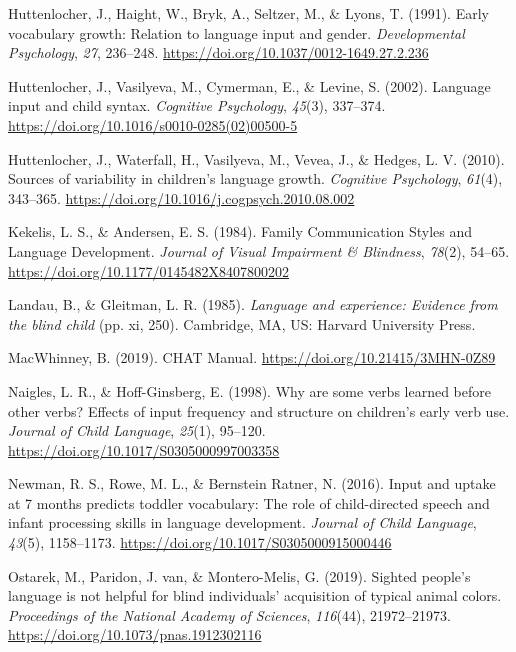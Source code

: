\documentclass[
  man]{apa6}
\newlength{\cslhangindent}
\newlength{\cslentryspacingunit} %
\newenvironment{CSLReferences}[2] %
 {%
  \setlength{\parindent}{0pt}
  \ifodd #1
  \let\oldpar\par
  \def\par{\hangindent=\cslhangindent\oldpar}
  \fi
  \setlength{\parskip}{#2\cslentryspacingunit}
 }%
 {}
\begin{document}
\begin{CSLReferences}{1}{0}
\leavevmode{}%
Huttenlocher, J., Haight, W., Bryk, A., Seltzer, M., \& Lyons, T. (1991). Early vocabulary growth: {Relation} to language input and gender. \emph{Developmental Psychology}, \emph{27}, 236--248. \url{https://doi.org/10.1037/0012-1649.27.2.236}

\leavevmode{}%
Huttenlocher, J., Vasilyeva, M., Cymerman, E., \& Levine, S. (2002). Language input and child syntax. \emph{Cognitive Psychology}, \emph{45}(3), 337--374. \url{https://doi.org/10.1016/s0010-0285(02)00500-5}

\leavevmode{}%
Huttenlocher, J., Waterfall, H., Vasilyeva, M., Vevea, J., \& Hedges, L. V. (2010). Sources of variability in children's language growth. \emph{Cognitive Psychology}, \emph{61}(4), 343--365. \url{https://doi.org/10.1016/j.cogpsych.2010.08.002}

\leavevmode{}%
Kekelis, L. S., \& Andersen, E. S. (1984). Family {Communication Styles} and {Language Development}. \emph{Journal of Visual Impairment \& Blindness}, \emph{78}(2), 54--65. \url{https://doi.org/10.1177/0145482X8407800202}

\leavevmode{}%
Landau, B., \& Gleitman, L. R. (1985). \emph{Language and experience: {Evidence} from the blind child} (pp. xi, 250). {Cambridge, MA, US}: {Harvard University Press}.

\leavevmode{}%
MacWhinney, B. (2019). {CHAT Manual}. \url{https://doi.org/10.21415/3MHN-0Z89}

\leavevmode{}%
Naigles, L. R., \& Hoff-Ginsberg, E. (1998). Why are some verbs learned before other verbs? {Effects} of input frequency and structure on children's early verb use. \emph{Journal of Child Language}, \emph{25}(1), 95--120. \url{https://doi.org/10.1017/S0305000997003358}

\leavevmode{}%
Newman, R. S., Rowe, M. L., \& Bernstein Ratner, N. (2016). Input and uptake at 7 months predicts toddler vocabulary: The role of child-directed speech and infant processing skills in language development. \emph{Journal of Child Language}, \emph{43}(5), 1158--1173. \url{https://doi.org/10.1017/S0305000915000446}

\leavevmode{}%
Ostarek, M., Paridon, J. van, \& Montero-Melis, G. (2019). Sighted people's language is not helpful for blind individuals' acquisition of typical animal colors. \emph{Proceedings of the National Academy of Sciences}, \emph{116}(44), 21972--21973. \url{https://doi.org/10.1073/pnas.1912302116}


\end{CSLReferences}
\end{document}
